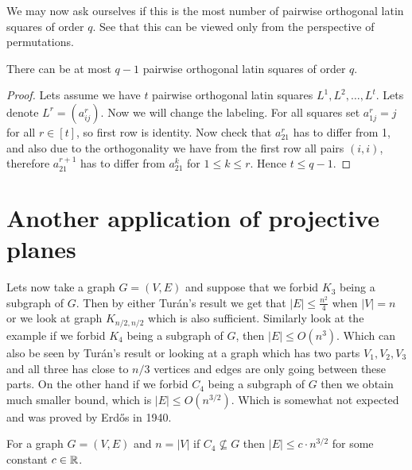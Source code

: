 We may now ask ourselves if this is the most number of pairwise orthogonal latin squares of order $q$. See that this can be viewed only from the perspective of permutations.

\begin{prop}
	There can be at most $q-1$ pairwise orthogonal latin squares of order $q$.
\end{prop}

\begin{proof}
	Lets assume we have $t$ pairwise orthogonal latin squares $L^1, L^2, \dots, L^t$. Lets denote $L^r = (a_{ij}^r)$. Now we will change the labeling. For all squares set $a_{1j}^r = j$  for all $r \in [t]$, so first row is identity. Now check that $a_{21}^r$ has to differ from 1, and also due to the orthogonality we have from the first row all pairs $(i,i)$, therefore $a_{21}^{r+1}$ has to differ from $a_{21}^{k}$ for $1 \leq k \leq r$. Hence $t \leq q-1$.
\end{proof}

\section{Another application of projective planes}

Lets now take a graph $G = (V,E)$ and suppose that we forbid $K_3$ being a subgraph of $G$. Then by either Turán's result we get that $|E| \leq \frac{n^2}{4}$ when $|V| = n$ or we look at graph $K_{n/2,n/2}$ which is also sufficient. Similarly look at the example if we forbid $K_4$ being a subgraph of $G$, then $|E| \leq O(n^3)$. Which can also be seen by Turán's result or looking at a graph which has two parts $V_1, V_2, V_3$ and all three has close to $n/3$ vertices and edges are only going between these parts. On the other hand if we forbid $C_4$ being a subgraph of $G$ then we obtain much smaller bound, which is $|E| \leq O(n^{3/2})$. Which is somewhat not expected and was proved by Erd\H os in 1940.

\begin{prop}
	For a graph $G = (V,E)$ and $n = |V|$ if $C_4 \not\subseteq G$ then $|E| \leq c \cdot n^{3/2}$ for some constant $c \in \mathbb{R}$.
\end{prop}

